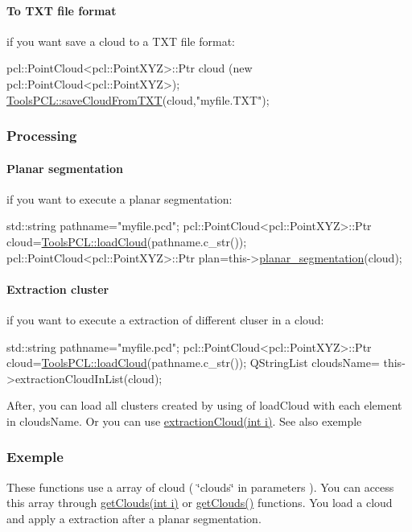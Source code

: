 \hypertarget{classToolsPCL_subs6}{}\paragraph{To T\-X\-T file format}\label{classToolsPCL_subs6}
if you want save a cloud to a T\-X\-T file format\-: 
\begin{DoxyCode}
 pcl::PointCloud<pcl::PointXYZ>::Ptr cloud (\textcolor{keyword}{new} pcl::PointCloud<pcl::PointXYZ>);
\hyperlink{classToolsPCL_a86b4d1d3f38ebfa68eba60c67f8ec0f6}{ToolsPCL::saveCloudFromTXT}(cloud,\textcolor{stringliteral}{"myfile.TXT"});
\end{DoxyCode}
\hypertarget{classToolsPCL_subs7}{}\subsubsection{Processing}\label{classToolsPCL_subs7}
\hypertarget{classToolsPCL_subs8}{}\paragraph{Planar segmentation}\label{classToolsPCL_subs8}
if you want to execute a planar segmentation\-: 
\begin{DoxyCode}
std::string pathname=\textcolor{stringliteral}{"myfile.pcd"};
pcl::PointCloud<pcl::PointXYZ>::Ptr cloud=\hyperlink{classToolsPCL_a852f0884ba496b7b2a3a77aabf3923f5}{ToolsPCL::loadCloud}(pathname.c\_str());
pcl::PointCloud<pcl::PointXYZ>::Ptr plan=this->\hyperlink{classToolsPCL_a302c666bcdd57fd901da32b4581dec5b}{planar\_segmentation}(cloud);
\end{DoxyCode}
\hypertarget{classToolsPCL_subs9}{}\paragraph{Extraction cluster}\label{classToolsPCL_subs9}
if you want to execute a extraction of different cluser in a cloud\-: 
\begin{DoxyCode}
std::string pathname=\textcolor{stringliteral}{"myfile.pcd"};
pcl::PointCloud<pcl::PointXYZ>::Ptr cloud=\hyperlink{classToolsPCL_a852f0884ba496b7b2a3a77aabf3923f5}{ToolsPCL::loadCloud}(pathname.c\_str());
QStringList cloudsName= this->extractionCloudInList(cloud);
\end{DoxyCode}
 After, you can load all clusters created by using of load\-Cloud with each element in clouds\-Name. Or you can use \hyperlink{classToolsPCL_ad99c261b21f228056cadade75f04a533}{extraction\-Cloud(int i)}. See also exemple\hypertarget{classToolsPCL_subs10}{}\subsubsection{Exemple}\label{classToolsPCL_subs10}
These functions use a array of cloud ( \char`\"{}clouds\char`\"{} in parameters ). You can access this array through \hyperlink{classToolsPCL_a15e8d38bafcdcf59bbdeb0d8de5fc7d1}{get\-Clouds(int i)} or \hyperlink{classToolsPCL_a1eb7da1d719387cb33f75827367ef9f4}{get\-Clouds()} functions. You load a cloud and apply a extraction after a planar segmentation.


